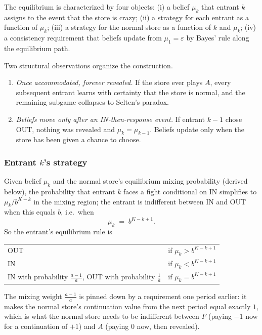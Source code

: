 The equilibrium is characterized by four objects: (i) a belief $\mu_k$ that entrant $k$ assigns to the event that the store is crazy; (ii) a strategy for each entrant as a function of $\mu_k$; (iii) a strategy for the normal store as a function of $k$ and $\mu_k$; (iv) a consistency requirement that beliefs update from $\mu_1 = \varepsilon$ by Bayes' rule along the equilibrium path.

Two structural observations organize the construction.
\begin{enumerate}
  \item \emph{Once accommodated, forever revealed.} If the store ever plays $A$, every subsequent entrant learns with certainty that the store is normal, and the remaining subgame collapses to Selten's paradox.
  \item \emph{Beliefs move only after an IN-then-response event.} If entrant $k-1$ chose OUT, nothing was revealed and $\mu_k = \mu_{k-1}$. Beliefs update only when the store has been given a chance to choose.
\end{enumerate}

\subsubsection*{Entrant $k$'s strategy}

Given belief $\mu_k$ and the normal store's equilibrium mixing probability (derived below), the probability that entrant $k$ faces a fight conditional on IN simplifies to $\mu_k / b^{K-k}$ in the mixing region; the entrant is indifferent between IN and OUT when this equals $b$, i.e.\ when
\[
  \mu_k \;=\; b^{K-k+1}.
\]
So the entrant's equilibrium rule is
\begin{center}
\begin{tabular}{ll}
  \hline
  OUT  & if $\mu_k > b^{K-k+1}$ \\
  IN   & if $\mu_k < b^{K-k+1}$ \\
  IN with probability $\tfrac{a-1}{a}$, OUT with probability $\tfrac{1}{a}$ & if $\mu_k = b^{K-k+1}$ \\
  \hline
\end{tabular}
\end{center}
The mixing weight $\tfrac{a-1}{a}$ is pinned down by a requirement one period earlier: it makes the normal store's continuation value from the next period equal exactly $1$, which is what the normal store needs to be indifferent between $F$ (paying $-1$ now for a continuation of $+1$) and $A$ (paying $0$ now, then revealed).

